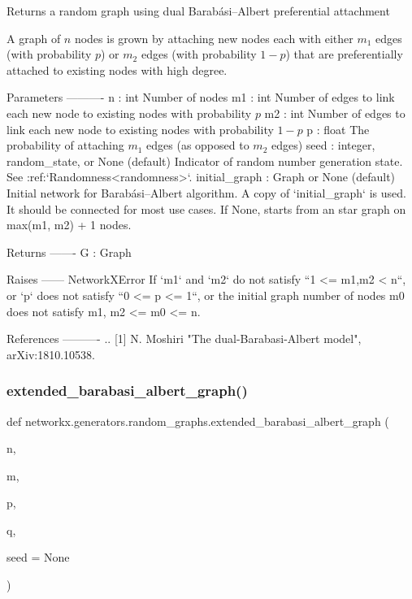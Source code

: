\begin{DoxyVerb}Returns a random graph using dual Barabási–Albert preferential attachment

A graph of $n$ nodes is grown by attaching new nodes each with either $m_1$
edges (with probability $p$) or $m_2$ edges (with probability $1-p$) that
are preferentially attached to existing nodes with high degree.

Parameters
----------
n : int
    Number of nodes
m1 : int
    Number of edges to link each new node to existing nodes with probability $p$
m2 : int
    Number of edges to link each new node to existing nodes with probability $1-p$
p : float
    The probability of attaching $m_1$ edges (as opposed to $m_2$ edges)
seed : integer, random_state, or None (default)
    Indicator of random number generation state.
    See :ref:`Randomness<randomness>`.
initial_graph : Graph or None (default)
    Initial network for Barabási–Albert algorithm.
    A copy of `initial_graph` is used.
    It should be connected for most use cases.
    If None, starts from an star graph on max(m1, m2) + 1 nodes.

Returns
-------
G : Graph

Raises
------
NetworkXError
    If `m1` and `m2` do not satisfy ``1 <= m1,m2 < n``, or
    `p` does not satisfy ``0 <= p <= 1``, or
    the initial graph number of nodes m0 does not satisfy m1, m2 <= m0 <= n.

References
----------
.. [1] N. Moshiri "The dual-Barabasi-Albert model", arXiv:1810.10538.
\end{DoxyVerb}
 \mbox{\label{namespacenetworkx_1_1generators_1_1random__graphs_a0ad298aab20b5729ec16794e20be71dd}} 
\subsubsection{\texorpdfstring{extended\+\_\+barabasi\+\_\+albert\+\_\+graph()}{extended\_barabasi\_albert\_graph()}}
{\footnotesize\ttfamily def networkx.\+generators.\+random\+\_\+graphs.\+extended\+\_\+barabasi\+\_\+albert\+\_\+graph (\begin{DoxyParamCaption}\item[{}]{n,  }\item[{}]{m,  }\item[{}]{p,  }\item[{}]{q,  }\item[{}]{seed = {\ttfamily None} }\end{DoxyParamCaption})}

